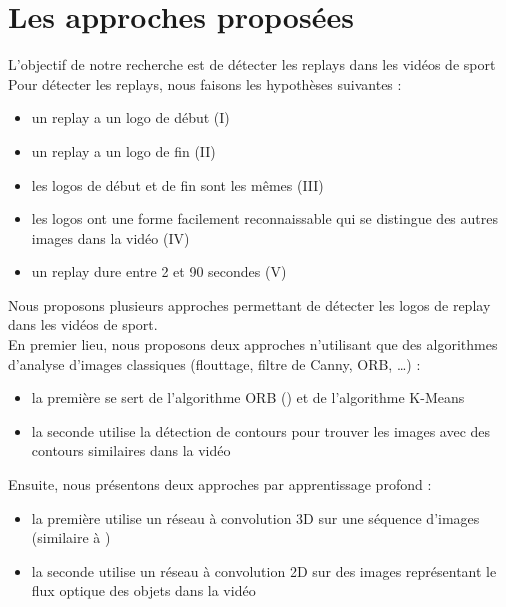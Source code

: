 \documentclass[11pt]{article}
\begin{document}
\newpage
\section{Les approches proposées}
\label{sec:org0cadf50}
L'objectif de notre recherche est de détecter les replays dans les vidéos de sport\\

Pour détecter les replays, nous faisons les hypothèses suivantes :\\
\begin{itemize}
\item un replay a un logo de début (I)\\
\item un replay a un logo de fin (II)\\
\item les logos de début et de fin sont les mêmes (III)\\
\item les logos ont une forme facilement reconnaissable qui se distingue des  autres images dans la vidéo (IV)\\
\item un replay dure entre 2 et 90 secondes (V)\\
\end{itemize}

Nous proposons plusieurs approches permettant de détecter les logos de replay dans les vidéos de sport.\\
En premier lieu, nous proposons deux approches n'utilisant que des algorithmes d'analyse d'images classiques (flouttage, filtre de Canny, ORB, \ldots{}) :\\
\begin{itemize}
\item la première se sert de l'algorithme ORB (\cite{Rublee_2011}) et de l'algorithme K-Means\\
\item la seconde utilise la détection de contours pour trouver les images avec des contours similaires dans la vidéo\\
\end{itemize}
Ensuite, nous présentons deux approches par apprentissage profond :\\
\begin{itemize}
\item la première utilise un réseau à convolution 3D sur une séquence d'images (similaire à \cite{Tran_2015})\\
\item la seconde utilise un réseau à convolution 2D sur des images représentant le flux optique des objets dans la vidéo\\
\end{itemize}
\end{document}
